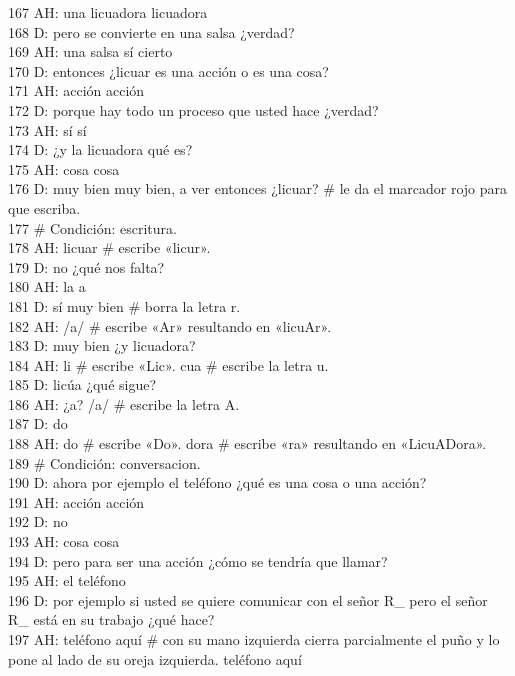 167 AH: una licuadora licuadora\\
168 D: pero se convierte en una salsa ¿verdad?\\
169 AH: una salsa sí cierto\\
170 D: entonces ¿licuar es una acción o es una cosa?\\
171 AH: acción acción\\
172 D: porque hay todo un proceso que usted hace ¿verdad?\\
173 AH: sí sí\\
174 D: ¿y la licuadora qué es?\\
175 AH: cosa cosa\\
176 D: muy bien muy bien, a ver entonces ¿licuar? \# le da el marcador rojo para que escriba.\\
177 \# Condición: escritura.\\
178 AH: licuar \# escribe «licur». \\
179 D: no ¿qué nos falta?\\
180 AH: la a\\
181 D: sí muy bien \# borra la letra r.\\
182 AH: /a/ \# escribe «Ar» resultando en «licuAr».\\
183 D: muy bien ¿y licuadora?\\
184 AH: li \# escribe «Lic». cua \# escribe la letra u.\\
185 D: licúa ¿qué sigue?\\
186 AH: ¿a? /a/ \# escribe la letra A.\\
187 D: do\\
188 AH: do \# escribe «Do». dora \# escribe «ra» resultando en «LicuADora».\\
189 \# Condición: conversacion.\\
190 D: ahora por ejemplo el teléfono ¿qué es una cosa o una acción?\\
191 AH: acción acción\\
192 D: no\\
193 AH: cosa cosa\\
194 D: pero para ser una acción ¿cómo se tendría que llamar?\\
195 AH: el teléfono\\
196 D: por ejemplo si usted se quiere comunicar con el señor R\_ pero el señor R\_ está en su trabajo ¿qué hace?\\
197 AH: teléfono aquí \# con su mano izquierda cierra parcialmente el puño y lo pone al lado de su oreja izquierda. teléfono aquí\\

